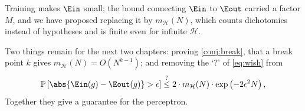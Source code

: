 Training makes \(\Ein\) small; the bound connecting \(\Ein\) to \(\Eout\)
carried a factor \(M\), and we have proposed replacing it by
\(m_{\mathcal{H}}(N)\), which counts dichotomies instead of hypotheses and is
finite even for infinite \(\mathcal{H}\).

Two things remain for the next two chapters: proving \autoref{conj:break}, that
a break point \(k\) gives \(m_{\mathcal{H}}(N) = O(N^{k-1})\); and removing the
`\(?\)' of \autoref{eq:wish} from
\[
    \mathbb{P}\left[ \abs{\Ein(g) - \Eout(g)} > \epsilon \right]
    \overset{?}{\le} 2 \cdot m_{\mathcal{H}}(N) \cdot
    \exp \left( -2 \epsilon^2 N \right) ,
\]
Together they give a guarantee for the perceptron.
